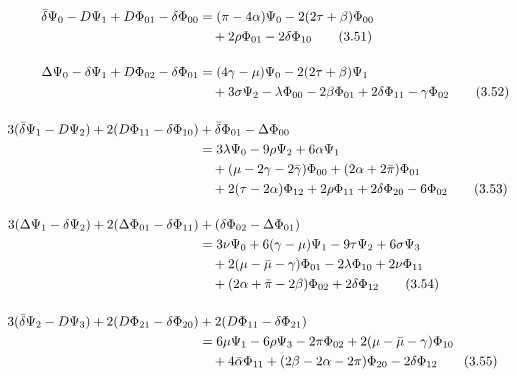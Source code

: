 \begin{align}
\bar{\delta} \Psi_{0} - D \Psi_{1} + D \Phi_{01} - \delta \Phi_{00} 
&= (\pi - 4 \alpha) \Psi_{0} - 2 (2 \tau + \beta) \Phi_{00} \notag \\
& \quad + 2 \rho \Phi_{01} - 2 \delta \Phi_{10}
\tag{3.51} \\[12pt]
%
\Delta \Psi_{0} - \delta \Psi_{1} + D \Phi_{02} - \delta \Phi_{01} 
&= (4 \gamma - \mu) \Psi_{0} - 2 (2 \tau + \beta) \Psi_{1} \notag \\
& \quad + 3 \sigma \Psi_{2} - \lambda \Phi_{00} - 2 \beta \Phi_{01} + 2 \delta \Phi_{11} - \gamma \Phi_{02}
\tag{3.52} \\[12pt]
%
3 (\bar{\delta} \Psi_{1} - D \Psi_{2}) + 2 (D \Phi_{11} - \delta \Phi_{10}) 
&+ \bar{\delta} \Phi_{01} - \Delta \Phi_{00} \notag \\
&= 3 \lambda \Psi_{0} - 9 \rho \Psi_{2} + 6 \alpha \Psi_{1} \notag \\
& \quad + (\mu - 2 \gamma - 2 \bar{\gamma}) \Phi_{00} + (2 \alpha + 2 \bar{\pi}) \Phi_{01} \notag \\
& \quad + 2 (\tau - 2 \alpha) \Phi_{12} + 2 \rho \Phi_{11} + 2 \delta \Phi_{20} - 6 \Phi_{02}
\tag{3.53} \\[12pt]
%
3 (\Delta \Psi_{1} - \delta \Psi_{2}) + 2 (\Delta \Phi_{01} - \delta \Phi_{11}) 
&+ (\delta \Phi_{02} - \Delta \Phi_{01}) \notag \\
&= 3 \nu \Psi_{0} + 6 (\gamma - \mu) \Psi_{1} - 9 \tau \Psi_{2} + 6 \sigma \Psi_{3} \notag \\
& \quad + 2 (\mu - \bar{\mu} - \gamma) \Phi_{01} - 2 \lambda \Phi_{10} + 2 \nu \Phi_{11} \notag \\
& \quad + (2 \alpha + \bar{\pi} - 2 \beta) \Phi_{02} + 2 \delta \Phi_{12}
\tag{3.54} \\[12pt]
%
3 (\bar{\delta} \Psi_{2} - D \Psi_{3}) + 2 (D \Phi_{21} - \delta \Phi_{20}) 
&+ 2 (D \Phi_{11} - \delta \Phi_{21}) \notag \\
&= 6 \mu \Psi_{1} - 6 \rho \Psi_{3} - 2 \pi \Phi_{02} + 2 (\mu - \bar{\mu} - \gamma) \Phi_{10} \notag \\
& \quad + 4 \bar{\alpha} \Phi_{11} + (2 \beta - 2 \alpha - 2 \pi) \Phi_{20} - 2 \delta \Phi_{12}
\tag{3.55}
\end{align}

